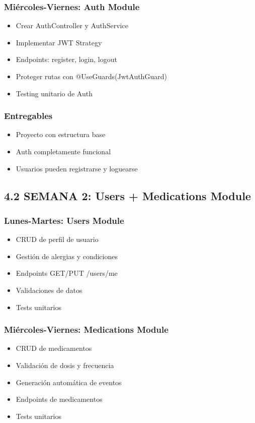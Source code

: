 \documentclass[12pt,a4paper]{article}
\begin{document}
\subsubsection{Miércoles-Viernes: Auth Module}
\begin{itemize}
    \item Crear AuthController y AuthService
    \item Implementar JWT Strategy
    \item Endpoints: register, login, logout
    \item Proteger rutas con @UseGuards(JwtAuthGuard)
    \item Testing unitario de Auth
\end{itemize}

\subsubsection{Entregables}
\begin{itemize}
    \item Proyecto con estructura base
    \item Auth completamente funcional
    \item Usuarios pueden registrarse y loguearse
\end{itemize}

\subsection{4.2 SEMANA 2: Users + Medications Module}

\subsubsection{Lunes-Martes: Users Module}
\begin{itemize}
    \item CRUD de perfil de usuario
    \item Gestión de alergias y condiciones
    \item Endpoints GET/PUT /users/me
    \item Validaciones de datos
    \item Tests unitarios
\end{itemize}

\subsubsection{Miércoles-Viernes: Medications Module}
\begin{itemize}
    \item CRUD de medicamentos
    \item Validación de dosis y frecuencia
    \item Generación automática de eventos
    \item Endpoints de medicamentos
    \item Tests unitarios
\end{itemize}
\end{document}
